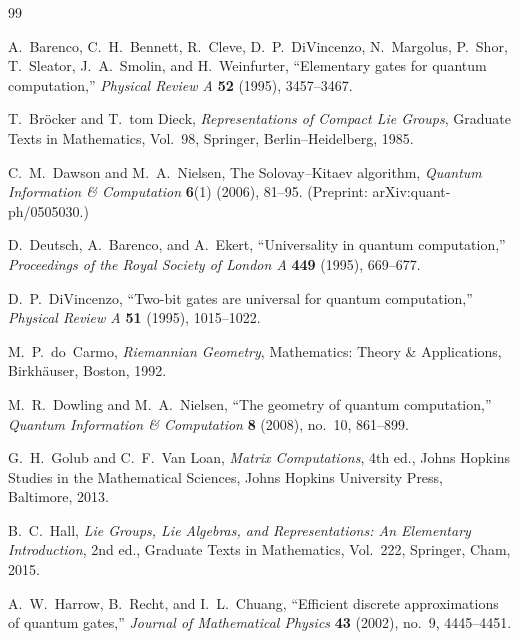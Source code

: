 \documentclass{article}%
\theoremstyle{definition}
\numberwithin{equation}{section}
\begin{document}
\begin{thebibliography}{99}

A.~Barenco, C.~H.~Bennett, R.~Cleve, D.~P.~DiVincenzo, N.~Margolus, P.~Shor, T.~Sleator, J.~A.~Smolin, and H.~Weinfurter,
\newblock ``Elementary gates for quantum computation,''
\newblock \emph{Physical Review A} \textbf{52} (1995), 3457--3467.

T.~Br{\"o}cker and T.~tom Dieck,
\newblock \emph{Representations of Compact Lie Groups},
\newblock Graduate Texts in Mathematics, Vol.~98, Springer, Berlin--Heidelberg, 1985.

C.~M.~Dawson and M.~A.~Nielsen,
\newblock The Solovay--Kitaev algorithm,
\newblock \emph{Quantum Information \& Computation} \textbf{6}(1) (2006), 81--95.
\newblock (Preprint: arXiv:quant-ph/0505030.)

D.~Deutsch, A.~Barenco, and A.~Ekert,
\newblock ``Universality in quantum computation,''
\newblock \emph{Proceedings of the Royal Society of London A} \textbf{449} (1995), 669--677.

D.~P.~DiVincenzo,
\newblock ``Two-bit gates are universal for quantum computation,''
\newblock \emph{Physical Review A} \textbf{51} (1995), 1015--1022.

M.~P.~do~Carmo,
\newblock \emph{Riemannian Geometry},
\newblock Mathematics: Theory \& Applications,
Birkh{\"a}user, Boston, 1992.

M.~R.~Dowling and M.~A.~Nielsen,
\newblock ``The geometry of quantum computation,''
\newblock \emph{Quantum Information \& Computation} \textbf{8} (2008), no.~10, 861--899.

G.~H.~Golub and C.~F.~Van Loan,
\newblock \emph{Matrix Computations},
\newblock 4th ed., Johns Hopkins Studies in the Mathematical Sciences,
Johns Hopkins University Press, Baltimore, 2013.

B.~C.~Hall,
\newblock \emph{Lie Groups, Lie Algebras, and Representations: An Elementary Introduction},
\newblock 2nd ed., Graduate Texts in Mathematics, Vol.~222, Springer, Cham, 2015.

A.~W.~Harrow, B.~Recht, and I.~L.~Chuang,
\newblock ``Efficient discrete approximations of quantum gates,''
\newblock \emph{Journal of Mathematical Physics} \textbf{43} (2002), no.~9, 4445--4451.


\end{thebibliography}
\end{document}
